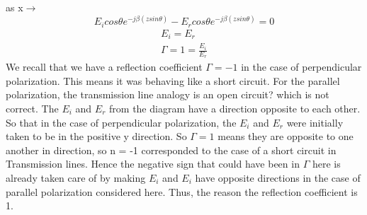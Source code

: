 as x$\rightarrow$
\begin{equation*}
E_{i}cos\theta e^{-j\beta(zsin\theta)} - E_{r}cos\theta e^{-j\beta(zsin\theta)} = 0
\end{equation*}
\begin{align*}
E_{i} = E_{r}\\
\Gamma= 1 = \frac{E_{i}}{E_{r}}
\end{align*}
We recall that we have a reflection coefficient $\Gamma = -1$ in the case of perpendicular polarization. This means it was behaving like a short circuit. For the parallel polarization, the transmission line analogy is an open circuit? which is not correct. The $E_{i}$ and $E_{r}$ from the diagram have a direction opposite to each other. So that in the case of perpendicular polarization, the $E_{i}$ and $ E_{r}$  were initially taken to be in the positive y direction. So   $\Gamma = 1$ means they are opposite to one another in direction, so n = -1 corresponded to the case of a short circuit in Transmission lines. Hence the negative sign that could have been in $\Gamma$ here is already taken care of by making $E_{i}$ and $E_{i}$ have opposite directions in the case of parallel polarization considered here. Thus, the reason the reflection coefficient is 1. 

